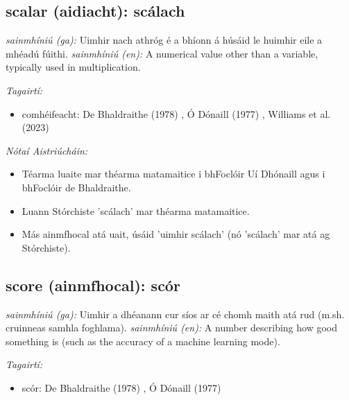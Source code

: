 \documentclass{article}
\begin{document}
\subsection*{scalar (aidiacht): scálach} 
 \noindent \textit{sainmhíniú (ga):} Uimhir nach athróg é a bhíonn á húsáid le huimhir eile a mhéadú fúithi.
\newline\newline
 \noindent \textit{sainmhíniú (en):} A numerical value other than a variable, typically used in multiplication.
\newline

 \noindent \textit{Tagairtí:}
\begin{itemize}
	\item comhéifeacht: De Bhaldraithe (1978) \cite{de-bhaldraithe}, Ó Dónaill (1977) \cite{odonaill}, Williams et al. (2023) \cite{storchiste}
\end{itemize}

 \noindent \textit{Nótaí Aistriúcháin:}
\begin{itemize}
	\item Téarma luaite mar théarma matamaitice i bhFoclóir Uí Dhónaill agus i bhFoclóir de Bhaldraithe.
	\item Luann Stórchiste 'scálach' mar théarma matamaitice.
	\item Más ainmfhocal atá uait, úsáid 'uimhir scálach' (nó 'scálach' mar atá ag Stórchiste).
\end{itemize}


\subsection*{score (ainmfhocal): scór} 
 \noindent \textit{sainmhíniú (ga):} Uimhir a dhéanann cur síos ar cé chomh maith atá rud (m.sh. cruinneas samhla foghlama).
\newline\newline
 \noindent \textit{sainmhíniú (en):} A number describing how good something is (such as the accuracy of a machine learning mode).
\newline

 \noindent \textit{Tagairtí:}
\begin{itemize}
	\item scór: De Bhaldraithe (1978) \cite{de-bhaldraithe}, Ó Dónaill (1977) \cite{odonaill}
\end{itemize}
\end{document}
